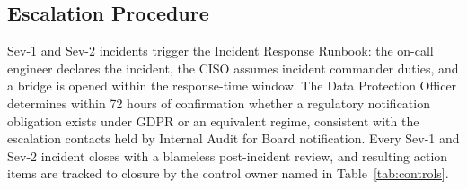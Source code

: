 \subsection{Escalation Procedure}
Sev-1 and Sev-2 incidents trigger the Incident Response Runbook: the on-call engineer
declares the incident, the CISO assumes incident commander duties, and a bridge is opened
within the response-time window. The Data Protection Officer determines within 72 hours
of confirmation whether a regulatory notification obligation exists under GDPR
\cite{gdpr} or an equivalent regime, consistent with the escalation contacts held by
Internal Audit for Board notification. Every Sev-1 and Sev-2 incident closes with a
blameless post-incident review, and resulting action items are tracked to closure by the
control owner named in Table~\ref{tab:controls}.
